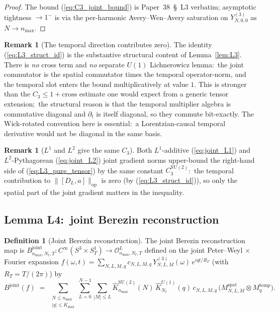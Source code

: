 \documentclass[11pt,a4paper]{article}
\theoremstyle{plain}
\theoremstyle{definition}
\newtheorem{definition}[theorem]{Definition}
\newtheorem{remark}[theorem]{Remark}
\newcommand{\nmax}{n_{\max}}
\newcommand{\Nt}{N_{t}}
\newcommand{\Kmax}{K_{\max}}
\newcommand{\Manifold}{S^{3}\times S^{1}_{T}}
\newcommand{\Op}{\mathcal{O}}
\newcommand{\opnorm}[1]{\lVert #1 \rVert_{\mathrm{op}}}
\newcommand{\SU}{\mathrm{SU}}
\newcommand{\Uone}{U(1)}
\newcommand{\DL}{D_{L}}
\newcommand{\Bjoint}{B^{\mathrm{joint}}}
\newcommand{\CthreeSU}{C_{3}^{\SU(2)}}
\newcommand{\spat}{\mathrm{spat}}
\newcommand{\temp}{\mathrm{temp}}
\newcommand{\Plancherel}{\hat}
\begin{document}
\begin{proof}
The bound (\ref{eq:C3_joint_bound}) is Paper~38~\S~L3 verbatim;
asymptotic tightness $\to 1^{-}$ is via the per-harmonic Avery--Wen--Avery
saturation on $Y^{(3)}_{N, 0, 0}$ as $N \to \nmax$. \qedhere
\end{proof}

\begin{remark}[The temporal direction contributes zero]\label{rem:no_cross}
The identity (\ref{eq:L3_struct_id}) is the substantive structural
content of Lemma~\ref{lem:L3}. There is \emph{no} cross term and
\emph{no} separate $\Uone$ Lichnerowicz lemma:\ the joint commutator
is the spatial commutator times the temporal operator-norm, and the
temporal slot enters the bound multiplicatively at value $1$. This is
stronger than the $C_{3} \le 1 + \mathrm{cross}$ estimate one would
expect from a generic tensor extension;\ the structural reason is that
the temporal multiplier algebra is commutative diagonal and
$\partial_{t}$ is itself diagonal, so they commute bit-exactly. The
Wick-rotated convention here is essential:\ a Lorentzian-causal
temporal derivative would not be diagonal in the same basis.
\end{remark}

\begin{remark}[$L^{1}$ and $L^{2}$ give the same $C_{3}$]\label{rem:L1_L2_equal}
Both $L^{1}$-additive (\ref{eq:joint_L1}) and $L^{2}$-Pythagorean
(\ref{eq:joint_L2}) joint gradient norms upper-bound the right-hand
side of (\ref{eq:L3_pure_tensor}) by the same constant $\CthreeSU$:\
the temporal contribution to $\opnorm{[\DL, a]}$ is zero (by
(\ref{eq:L3_struct_id})), so only the spatial part of the joint
gradient matters in the inequality.
\end{remark}

\subsection{Lemma L4:\ joint Berezin reconstruction}
\label{sec:L4}

\begin{definition}[Joint Berezin reconstruction]\label{def:joint_berezin}
The joint Berezin reconstruction map is
$\Bjoint_{\nmax,\Nt,T} : C^{\infty}(\Manifold) \to \Op^{L}_{\nmax,\Nt,T}$
defined on the joint Peter--Weyl $\times$ Fourier expansion
$f(\omega, t) = \sum_{N,L,M,q} c_{N,L,M,q}\,Y^{(3)}_{N,L,M}(\omega)\,
e^{i q t / R_{T}}$ (with $R_{T} = T/(2\pi)$) by
\begin{equation}\label{eq:joint_berezin}
   \Bjoint(f) \;=\; \sum_{\substack{N \le \nmax \\ |q| \le \Kmax}}
   \sum_{L = 0}^{N - 1} \sum_{|M| \le L}
   \Plancherel{K}^{\SU(2)}_{\nmax}(N)\,\Plancherel{K}^{\Uone}_{\Nt}(q)\,
   c_{N,L,M,q}\,\bigl(M^{\spat}_{N,L,M} \otimes M^{\temp}_{q}\bigr).
\end{equation}
\end{definition}
\end{document}
